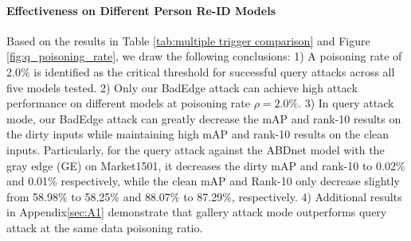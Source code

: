 \documentclass[sigconf,authordraft]{acmart}
\begin{document}
\paragraph{Effectiveness on Different Person Re-ID Models}
Based on the results in Table \ref{tab:multiple trigger comparison} and Figure \ref{fig:q_poisoning_rate}, we draw the following conclusions:
1) A poisoning rate of 2.0$\%$ is identified as the critical threshold for successful query attacks across all five models tested.
2) Only our BadEdge attack can achieve high attack performance on different models at poisoning rate $\rho = 2.0\%$. 
3) In query attack mode, our BadEdge attack can greatly decrease the mAP and rank-10 results on the dirty inputs while maintaining high mAP and rank-10 results on the clean inputs. Particularly, for the query attack against the ABDnet model with the gray edge (GE) on Market1501, it decreases the dirty mAP and rank-10 to 0.02$\%$ and 0.01$\%$ respectively, while the clean mAP and Rank-10 only decrease slightly from 58.98$\%$ to 58.25$\%$ and 88.07$\%$ to 87.29$\%$, respectively.
4) Additional results in Appendix\ref{sec:A1} demonstrate that gallery attack mode outperforms query attack at the same data poisoning ratio. 

\end{document}
